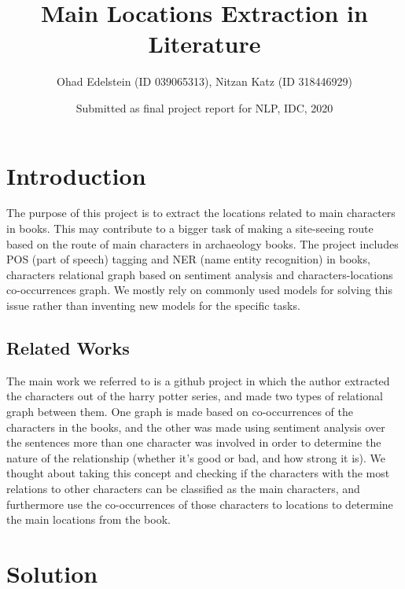 \documentclass{article}
\title{Main Locations Extraction in Literature}
\author{Ohad Edelstein (ID 039065313), Nitzan Katz (ID 318446929)}
\date{Submitted as final project report for NLP, IDC, 2020}
\begin{document}
\maketitle

\section{Introduction}

The purpose of this project is to extract the locations related to main characters in books. This may contribute to a bigger task of making a site-seeing route based on the route of main characters in archaeology books. The project includes POS (part of speech) tagging and NER (name entity recognition) in books, characters relational graph based on sentiment analysis and characters-locations co-occurrences graph. We mostly rely on commonly used models for solving this issue rather than inventing new models for the specific tasks.

\subsection{Related Works}
The main work we referred to is a github project\cite{hzjken2019char} in which the author extracted the characters out of the harry potter series, and made two types of relational graph between them. One graph is made based on co-occurrences of the characters in the books, and the other was made using sentiment analysis over the sentences more than one character was involved in order to determine the nature of the relationship (whether it's good or bad, and how strong it is). We thought about taking this concept and checking if the characters with the most relations to other characters can be classified as the main characters, and furthermore use the co-occurrences of those characters to locations to determine the main locations from the book.

\pagebreak
\section{Solution}
\end{document}
